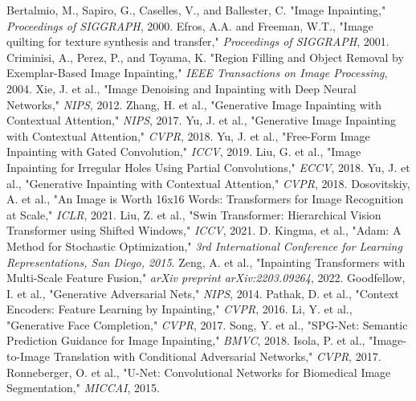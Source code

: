 \documentclass[sigconf]{acmart}
\begin{document}
\begin{thebibliography}{99}
     Bertalmio, M., Sapiro, G., Caselles, V., and Ballester, C. "Image Inpainting," \textit{Proceedings of SIGGRAPH}, 2000.
     Efros, A.A. and Freeman, W.T., "Image quilting for texture synthesis and transfer," \textit{Proceedings of SIGGRAPH}, 2001.
     Criminisi, A., Perez, P., and Toyama, K. "Region Filling and Object Removal by Exemplar-Based Image Inpainting," \textit{IEEE Transactions on Image Processing}, 2004.
     Xie, J. et al., "Image Denoising and Inpainting with Deep Neural Networks," \textit{NIPS}, 2012.
     Zhang, H. et al., "Generative Image Inpainting with Contextual Attention," \textit{NIPS}, 2017.
     Yu, J. et al., "Generative Image Inpainting with Contextual Attention," \textit{CVPR}, 2018.
     Yu, J. et al., "Free-Form Image Inpainting with Gated Convolution," \textit{ICCV}, 2019.
     Liu, G. et al., "Image Inpainting for Irregular Holes Using Partial Convolutions," \textit{ECCV}, 2018.
     Yu, J. et al., "Generative Inpainting with Contextual Attention," \textit{CVPR}, 2018.
     Dosovitskiy, A. et al., "An Image is Worth 16x16 Words: Transformers for Image Recognition at Scale," \textit{ICLR}, 2021.
     Liu, Z. et al., "Swin Transformer: Hierarchical Vision Transformer using Shifted Windows," \textit{ICCV}, 2021.
     D. Kingma, et al., "Adam: A Method for Stochastic Optimization," \textit{3rd International Conference for Learning Representations, San Diego, 2015}.
     Zeng, A. et al., "Inpainting Transformers with Multi-Scale Feature Fusion," \textit{arXiv preprint arXiv:2203.09264}, 2022.
     Goodfellow, I. et al., "Generative Adversarial Nets," \textit{NIPS}, 2014.
     Pathak, D. et al., "Context Encoders: Feature Learning by Inpainting," \textit{CVPR}, 2016.
     Li, Y. et al., "Generative Face Completion," \textit{CVPR}, 2017.
     Song, Y. et al., "SPG-Net: Semantic Prediction Guidance for Image Inpainting," \textit{BMVC}, 2018.
     Isola, P. et al., "Image-to-Image Translation with Conditional Adversarial Networks," \textit{CVPR}, 2017.
     Ronneberger, O. et al., "U-Net: Convolutional Networks for Biomedical Image Segmentation," \textit{MICCAI}, 2015.

\end{thebibliography}
\end{document}
